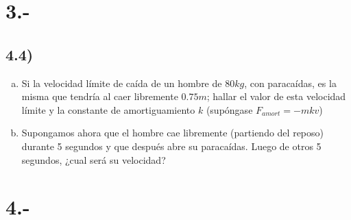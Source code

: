 \documentclass{article}
\begin{document}
\section*{3.-}
\subsection*{4.4)}
\begin{enumerate}[a)]
    \item Si la velocidad límite de caída de un hombre de $80kg$, con paracaídas, es 
    la misma que tendría al caer libremente $0.75m$; hallar el valor de esta velocidad 
    límite y la constante de amortiguamiento $k$ (supóngase $F_{amort} = -mkv$)
    \item Supongamos ahora que el hombre cae libremente (partiendo del reposo) durante 
    5 segundos y que después abre su paracaídas. Luego de otros 5 segundos, ¿cual será su 
    velocidad? 
\end{enumerate}
\begin{tcolorbox}[breakable]
    
\end{tcolorbox}

\section*{4.-}
\end{document}
